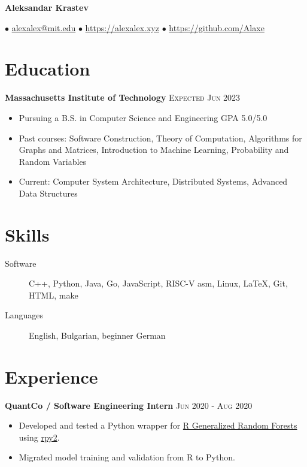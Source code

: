 \documentclass[letterpaper,11pt]{article}
\author{Aleksandar Krastev}
\date{2020-12-21}
\begin{document}
\setlength{\belowdisplayskip}{\parskip}
\setlength{\belowdisplayshortskip}{\belowdisplayskip}
\setlength{\abovedisplayskip}{\parskip}
\setlength{\abovedisplayshortskip}{\abovedisplayskip}



\centerline{{\Huge \bf Aleksandar Krastev}}
$\bullet$ \href{mailto:alexalex@mit.edu}{alexalex@mit.edu} \hfill
$\bullet$ \href{https://alexalex.xyz}{https://alexalex.xyz} \hfill
$\bullet$ \href{https://github.com/Alaxe}{https://github.com/Alaxe} \hfill

\section*{Education}
\textbf{Massachusetts Institute of Technology}
\hfill
\textsc{Expected Jun 2023}

\begin{itemize}
    \item Pursuing a B.S. in Computer Science and Engineering
        \hfill GPA 5.0/5.0
    \item Past courses:
        Software Construction,
        Theory of Computation,
        Algorithms for Graphs and Matrices,
        Introduction to Machine Learning,
        Probability and Random Variables
    \item Current:
        Computer System Architecture,
        Distributed Systems,
        Advanced Data Structures
\end{itemize}

\section*{Skills}
\begin{description}
    \item[Software] C++, Python, Java, Go, JavaScript, RISC-V asm, Linux, LaTeX, Git,
        HTML, make
    \item[Languages] English, Bulgarian, beginner German
\end{description}

\section*{Experience}
\textbf{QuantCo / Software Engineering Intern}
\hfill
\textsc{Jun 2020 - Aug 2020}
\begin{itemize}
    \item Developed and tested a Python wrapper for
        \href{https://grf-labs.github.io/}{R Generalized Random Forests} using
        \href{https://rpy2.github.io/}{rpy2}.
    \item Migrated model training and validation from R to Python.
\end{itemize}
\end{document}

